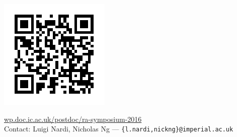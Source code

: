 \documentclass[a3,portrait]{a0poster}
\begin{document}
\vfill
\noindent
\begin{minipage}{0.13\linewidth}
  \includegraphics[width=\linewidth]{qr.png}
\end{minipage}
\begin{minipage}{0.85\linewidth}
\flushright
\href{http://wp.doc.ic.ac.uk/postdoc/ra-symposium-2016}
     {wp.doc.ic.ac.uk/postdoc/ra-symposium-2016}
\\[0.5cm]
{\small Contact: Luigi Nardi, Nicholas Ng --- \texttt{\{l.nardi,nickng\}@imperial.ac.uk}}
\end{minipage}
\end{document}
